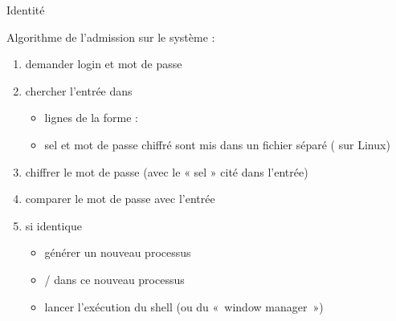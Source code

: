 \begin {frame} {Identité}

    Algorithme de l'admission sur le système :
    \begin {enumerate}
	\item demander login et mot de passe
	\item chercher l'entrée dans 
	    \begin {itemize}
		\item lignes de la forme : \\
		    {\fD {}}
		\item sel et mot de passe chiffré sont mis dans
		    un fichier séparé ( sur Linux)
	    \end {itemize}
	\item chiffrer le mot de passe (avec le « sel » cité
	    dans l'entrée)
	\item comparer le mot de passe avec l'entrée
	\item si identique
	    \begin {itemize}
		\item générer un nouveau processus
		\item {} / 
		    dans ce nouveau processus
		\item lancer l'exécution du shell (ou du
		    «~window manager~»)
	    \end {itemize}
    \end {enumerate}
\end {frame}

